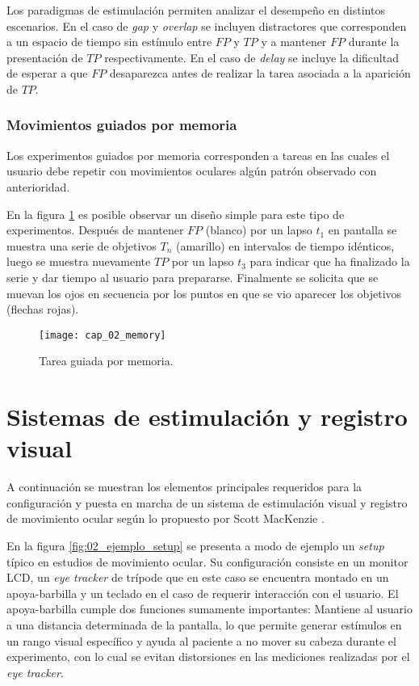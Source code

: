 \documentclass[../Main.tex]{subfiles}
\begin{document}
				Los paradigmas de estimulación permiten analizar el desempeño en distintos escenarios. En el caso de \textit{gap} y \textit{overlap} se incluyen distractores que corresponden a un espacio de tiempo sin estímulo entre $FP$ y $TP$ y a mantener $FP$ durante la presentación de $TP$ respectivamente. En el caso de \textit{delay} se incluye la dificultad de esperar a que $FP$ desaparezca antes de realizar la tarea asociada a la aparición de $TP$. 

			\vspace{-5mm}
			\subsubsection{Movimientos guiados por memoria}
			\label{ssub:movimientos_memoria}
				Los experimentos guiados por memoria corresponden a tareas en las cuales el usuario debe repetir con movimientos oculares algún patrón observado con anterioridad. 

				En la figura \ref{fig:02_memory} es posible observar un diseño simple para este tipo de experimentos. Después de mantener $FP$ (blanco) por un lapso $t_1$ en pantalla se muestra una serie de objetivos $T_n$ (amarillo) en intervalos de tiempo idénticos, luego se muestra nuevamente $TP$ por un lapso $t_3$ para indicar que ha finalizado la serie y dar tiempo al usuario para prepararse. Finalmente se solicita que se muevan los ojos en secuencia por los puntos en que se vio aparecer los objetivos (flechas rojas).
				\begin{figure}[H]
					\centering
					\texttt{[image: cap\_02\_memory]}
					\caption{Tarea guiada por memoria.}
					\label{fig:02_memory}
				\end{figure} 
	
	\section{Sistemas de estimulación y registro visual}
	\label{sec:02_sistemas_de_estimulacion_registro_visual}
		A continuación se muestran los elementos principales requeridos para la configuración y puesta en marcha de un sistema de estimulación visual y registro de movimiento ocular según lo propuesto por Scott MacKenzie \cite{article:baseInfo}. 

		En la figura \ref{fig:02_ejemplo_setup} se presenta a modo de ejemplo un \textit{setup} típico en estudios de movimiento ocular. Su configuración consiste en un monitor LCD, un \textit{eye tracker} de trípode que en este caso se encuentra montado en un apoya-barbilla y un teclado en el caso de requerir interacción con el usuario. El apoya-barbilla cumple dos funciones sumamente importantes: Mantiene al usuario a una distancia determinada de la pantalla, lo que permite generar estímulos en un rango visual específico y ayuda al paciente a no mover su cabeza durante el experimento, con lo cual se evitan distorsiones en las mediciones realizadas por el \textit{eye tracker}.  
\end{document}
